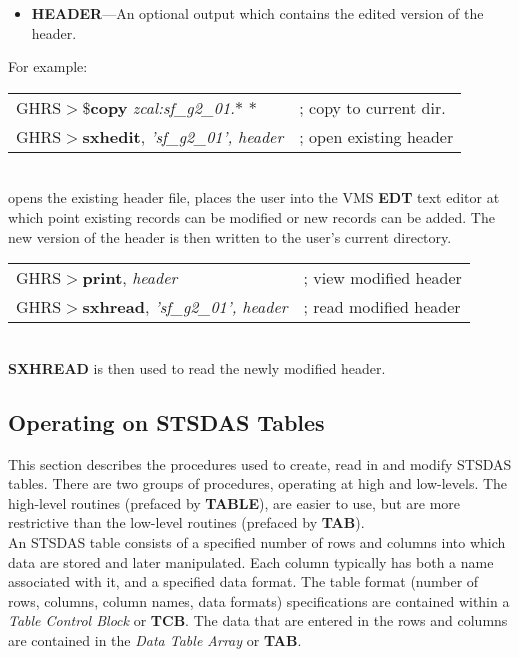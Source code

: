 \begin{description}
\begin{itemize}
\item {\bf HEADER}---An optional output which contains the edited version of the 
header.  
\end{itemize}
\newpage

\noindent
For 
example:\\

\begin{tabular}{ll}
GHRS$>$\${\bf copy} {\it zcal:sf\_g2\_01.$*$ $*$} & ; copy to current dir.\\
GHRS$>${\bf sxhedit}, {\it 'sf\_g2\_01', header} & ; open existing header\\
\end{tabular}\\

\noindent
opens the existing header file, places the user into the VMS {\bf EDT} text
editor at which point existing records can be modified or new records can be
added.  The new version of the header is then written to the user's current
directory.\\

\begin{tabular}{ll}
GHRS$>${\bf print}, {\it header} & ; view modified header\\
GHRS$>${\bf sxhread}, {\it 'sf\_g2\_01', header} & ; read modified header\\
\end{tabular}\\

\noindent
{\bf SXHREAD} is then used to read the newly modified header. 
\end{description}

\subsection{\bf Operating on STSDAS Tables}

This section describes the procedures used to create, read in and modify 
STSDAS tables. There are two groups of procedures, operating at 
high and low-levels. The high-level routines (prefaced by {\bf TABLE}), 
are easier to use, but are more restrictive than the low-level routines 
(prefaced by {\bf TAB}).\\

An STSDAS 
table consists of a specified number of rows and columns into which 
data are stored and later manipulated.  Each column typically has both a name 
associated with it, and a specified data format.  The table format 
(number of rows, columns, column names, data formats) specifications are 
contained within a {\it Table Control Block} or {\bf TCB}.  The data that are 
entered in the rows and columns are contained in the {\it Data Table Array} or 
{\bf TAB}.\\

